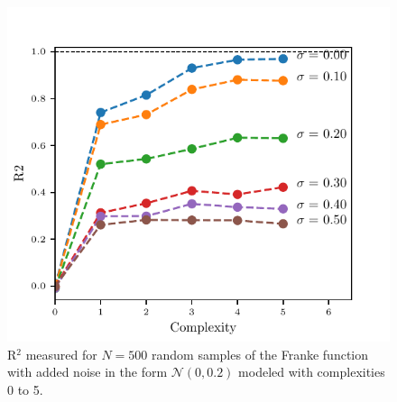 \documentclass[reprint, english, nofootinbib]{revtex4-2}
\begin{document}
    \begin{figure}[h!tb]
        \center
        \includegraphics[width=\columnwidth]{OLS_R2_noise.pdf}
        \caption{R$^2$ measured for $N=500$ random samples of the Franke function with added noise in the form $\mathcal N(0, 0.2)$ modeled with complexities 0 to 5.}
    \end{figure}
\end{document}
